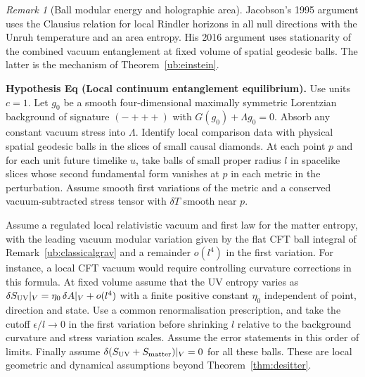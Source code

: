 \documentclass[aps,pra,onecolumn,superscriptaddress,nofootinbib,10pt]{revtex4-2}
\theoremstyle{definition}
\theoremstyle{remark}
\newtheorem{remark}[theorem]{Remark}
\begin{document}
\begin{remark}[Ball modular energy and holographic area]
Jacobson's 1995 argument uses the Clausius relation for local Rindler
horizons in all null directions with the Unruh temperature and an
area entropy. His 2016 argument uses stationarity of the combined
vacuum entanglement at fixed volume of spatial geodesic balls.
The latter is the mechanism of Theorem~\ref{ub:einstein}.
\cite{n1-rt,ub:hrt,ub:flm,ub:faulkner,n1-jacobson,ub:jac16}
\end{remark}

\smallskip\noindent\textbf{Hypothesis Eq (Local continuum entanglement equilibrium).}  Use units $c=1$. Let $g_0$ be a smooth four-dimensional maximally
symmetric Lorentzian background of signature $(-+++)$ with
$G(g_0)+\Lambda g_0=0$. Absorb any constant vacuum stress into
$\Lambda$. Identify local comparison data with physical spatial
geodesic balls in the slices of small causal diamonds. At each point
$p$ and for each unit future timelike $u$, take balls of small
proper radius $l$ in spacelike slices whose second fundamental form
vanishes at $p$ in each metric in the perturbation. Assume smooth
first variations of the metric and a conserved vacuum-subtracted
stress tensor with $\delta T$ smooth near $p$.

Assume a regulated local relativistic vacuum and first law for the
matter entropy, with the leading vacuum modular variation given by the
flat CFT ball integral of Remark~\ref{ub:classicalgrav} and a
remainder $o(l^4)$ in the first variation. For instance, a local CFT
vacuum would require controlling curvature corrections in this
formula. At fixed volume assume that the UV entropy varies as
$\delta S_{\rm UV}|_V=\eta_0\,\delta A|_V+o(l^4)$ with a finite
positive constant $\eta_0$ independent of point, direction and state.
Use a common renormalisation prescription, and take the cutoff
$\epsilon/l\to0$ in the first variation before shrinking $l$ relative
to the background curvature and stress variation scales.
Assume the error statements in this order of limits. Finally assume
$\delta(S_{\rm UV}+S_{\rm matter})|_V=0$ for all these balls.
These are local geometric and dynamical assumptions beyond Theorem~\ref{thm:desitter}.
\end{document}
